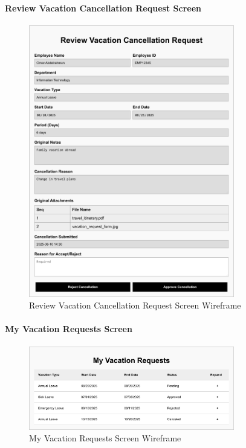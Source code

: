 \documentclass[12pt,a4paper]{article}
\begin{document}
\paragraph{Review Vacation Cancellation Request Screen}
\begin{figure}[H]
\centering
\includegraphics[width=0.8\textwidth]{Wireframes/Review-Vacation-Cancellation-Request/Review-Vacation-Cancellation-Request-1.png}
\caption{Review Vacation Cancellation Request Screen Wireframe}
\label{fig:wireframe-review-cancellation}
\end{figure}

\paragraph{My Vacation Requests Screen}
\begin{figure}[H]
\centering
\includegraphics[width=0.8\textwidth]{Wireframes/My-Vacation-Requests/My-Vacation-Requests-1.png}
\caption{My Vacation Requests Screen Wireframe}
\label{fig:wireframe-my-vacation-requests}
\end{figure}
\end{document}
